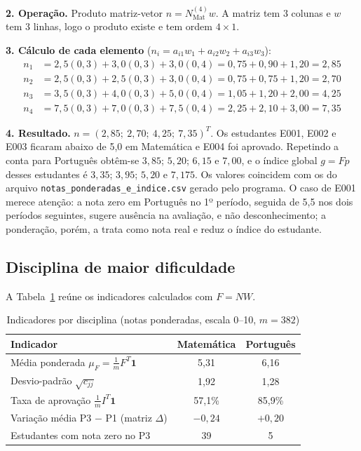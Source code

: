 \documentclass[12pt,a4paper]{article}
\newcommand{\fonte}[1]{\par\vspace{2pt}{\footnotesize Fonte: #1\par}}
\begin{document}
\textbf{2. Operação.} Produto matriz-vetor $n=N_{\text{Mat}}^{(4)}w$. A matriz tem 3 colunas e $w$ tem 3 linhas, logo o produto existe e tem ordem $4\times 1$.

\textbf{3. Cálculo de cada elemento} ($n_i=a_{i1}w_1+a_{i2}w_2+a_{i3}w_3$):
\begin{align*}
n_1 &= 2{,}5(0{,}3)+3{,}0(0{,}3)+3{,}0(0{,}4)=0{,}75+0{,}90+1{,}20=2{,}85\\
n_2 &= 2{,}5(0{,}3)+2{,}5(0{,}3)+3{,}0(0{,}4)=0{,}75+0{,}75+1{,}20=2{,}70\\
n_3 &= 3{,}5(0{,}3)+4{,}0(0{,}3)+5{,}0(0{,}4)=1{,}05+1{,}20+2{,}00=4{,}25\\
n_4 &= 7{,}5(0{,}3)+7{,}0(0{,}3)+7{,}5(0{,}4)=2{,}25+2{,}10+3{,}00=7{,}35
\end{align*}

\textbf{4. Resultado.} $n=(2{,}85;\ 2{,}70;\ 4{,}25;\ 7{,}35)^T$. Os estudantes E001, E002 e E003 ficaram abaixo de 5,0 em Matemática e E004 foi aprovado. Repetindo a conta para Português obtêm-se $3{,}85$; $5{,}20$; $6{,}15$ e $7{,}00$, e o índice global $g=Fp$ desses estudantes é $3{,}35$; $3{,}95$; $5{,}20$ e $7{,}175$. Os valores coincidem com os do arquivo \texttt{notas\_ponderadas\_e\_indice.csv} gerado pelo programa. O caso de E001 merece atenção: a nota zero em Português no 1º período, seguida de 5,5 nos dois períodos seguintes, sugere ausência na avaliação, e não desconhecimento; a ponderação, porém, a trata como nota real e reduz o índice do estudante.

\subsection{Disciplina de maior dificuldade}

A Tabela~\ref{tab:indicadores} reúne os indicadores calculados com $F=NW$.

\begin{table}[htbp]
\centering
\caption{Indicadores por disciplina (notas ponderadas, escala 0--10, $m=382$)}
\label{tab:indicadores}
\begin{singlespace}\small
\begin{tabular}{lcc}
\toprule
Indicador & Matemática & Português\\
\midrule
Média ponderada $\mu_F=\frac{1}{m}F^T\mathbf{1}$ & 5,31 & 6,16\\
Desvio-padrão $\sqrt{c_{jj}}$ & 1,92 & 1,28\\
Taxa de aprovação $\frac{1}{m}I^T\mathbf{1}$ & 57,1\% & 85,9\%\\
Variação média P3 $-$ P1 (matriz $\Delta$) & $-0{,}24$ & $+0{,}20$\\
Estudantes com nota zero no P3 & 39 & 5\\
\bottomrule
\end{tabular}
\end{singlespace}
\fonte{elaborada pelos autores a partir dos resultados do código (2026).}
\end{table}
\end{document}
